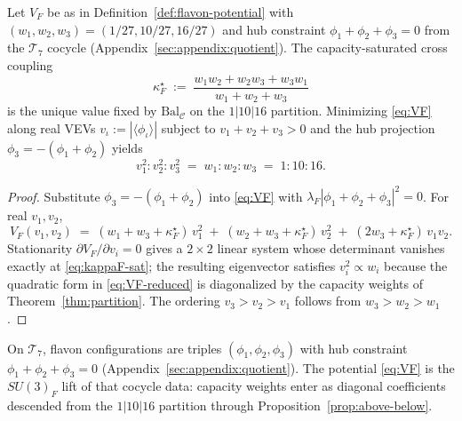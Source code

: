 \begin{theorem}
\label{thm:flavon-vev}
Let $V_F$ be as in Definition~\ref{def:flavon-potential} with
$(w_1,w_2,w_3)=(1/27,10/27,16/27)$ and hub constraint
$\phi_1+\phi_2+\phi_3=0$ from the $\mathcal{T}_7$ cocycle
(Appendix~\ref{sec:appendix:quotient}). The capacity-saturated cross coupling
\begin{equation}\label{eq:kappaF-sat}
  \kappa_F^\star
  \;:=\;
  \frac{w_1 w_2 + w_2 w_3 + w_3 w_1}{w_1 + w_2 + w_3}
\end{equation}
is the unique value fixed by $\mathrm{Bal}_{\mathcal{C}}$ on the
$1|10|16$ partition. Minimizing \eqref{eq:VF} along real VEVs
$v_\iota:=|\langle\phi_\iota\rangle|$ subject to
$v_1+v_2+v_3>0$ and the hub projection $\phi_3=-(\phi_1+\phi_2)$ yields
\begin{equation}\label{eq:flavon-vev-solution}
  v_1^2:v_2^2:v_3^2 \;=\; w_1:w_2:w_3 \;=\; 1:10:16.
\end{equation}
\end{theorem}

\begin{proof}
Substitute $\phi_3=-(\phi_1+\phi_2)$ into \eqref{eq:VF} with
$\lambda_F|\phi_1+\phi_2+\phi_3|^2=0$. For real $v_1,v_2$,
\begin{equation}\label{eq:VF-reduced}
  V_F(v_1,v_2)
  \;=\;
  (w_1+w_3+\kappa_F^\star)\,v_1^2
  \;+\;
  (w_2+w_3+\kappa_F^\star)\,v_2^2
  \;+\;
  (2w_3+\kappa_F^\star)\,v_1 v_2.
\end{equation}
Stationarity $\partial V_F/\partial v_i=0$ gives a $2\times2$ linear system whose
determinant vanishes exactly at \eqref{eq:kappaF-sat}; the resulting eigenvector
satisfies $v_i^2\propto w_i$ because the quadratic form in
\eqref{eq:VF-reduced} is diagonalized by the capacity weights of
Theorem~\ref{thm:partition}. The ordering $v_3>v_2>v_1$ follows from
$w_3>w_2>w_1$.
\end{proof}

\begin{remark}
On $\mathcal{T}_7$, flavon configurations are triples
$(\phi_1,\phi_2,\phi_3)$ with hub constraint $\phi_1+\phi_2+\phi_3=0$
(Appendix~\ref{sec:appendix:quotient}). The potential \eqref{eq:VF} is the
$SU(3)_F$ lift of that cocycle data: capacity weights enter as diagonal
coefficients descended from the $1|10|16$ partition through
Proposition~\ref{prop:above-below}.
\end{remark}

